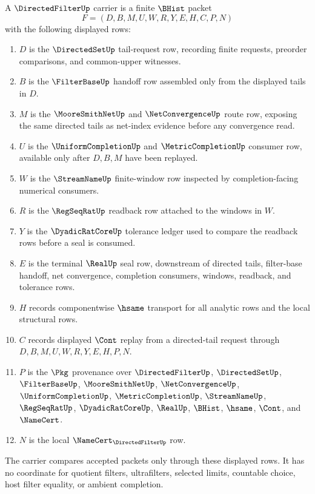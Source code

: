 \begin{definition}\label{def:directed-filter-carrier}
A $\DirectedFilterUp$ carrier is a finite $\BHist$ packet
$$
F=(D,B,M,U,W,R,Y,E,H,C,P,N)
$$
with the following displayed rows:
\begin{enumerate}
\item $D$ is the $\DirectedSetUp$ tail-request row, recording finite requests, preorder comparisons, and common-upper witnesses.
\item $B$ is the $\FilterBaseUp$ handoff row assembled only from the displayed tails in $D$.
\item $M$ is the $\MooreSmithNetUp$ and $\NetConvergenceUp$ route row, exposing the same directed tails as net-index evidence before any convergence read.
\item $U$ is the $\UniformCompletionUp$ and $\MetricCompletionUp$ consumer row, available only after $D,B,M$ have been replayed.
\item $W$ is the $\StreamNameUp$ finite-window row inspected by completion-facing numerical consumers.
\item $R$ is the $\RegSeqRatUp$ readback row attached to the windows in $W$.
\item $Y$ is the $\DyadicRatCoreUp$ tolerance ledger used to compare the readback rows before a seal is consumed.
\item $E$ is the terminal $\RealUp$ seal row, downstream of directed tails, filter-base handoff, net convergence, completion consumers, windows, readback, and tolerance rows.
\item $H$ records componentwise $\hsame$ transport for all analytic rows and the local structural rows.
\item $C$ records displayed $\Cont$ replay from a directed-tail request through $D,B,M,U,W,R,Y,E,H,P,N$.
\item $P$ is the $\Pkg$ provenance over $\DirectedFilterUp$, $\DirectedSetUp$, $\FilterBaseUp$, $\MooreSmithNetUp$, $\NetConvergenceUp$, $\UniformCompletionUp$, $\MetricCompletionUp$, $\StreamNameUp$, $\RegSeqRatUp$, $\DyadicRatCoreUp$, $\RealUp$, $\BHist$, $\hsame$, $\Cont$, and $\NameCert$.
\item $N$ is the local $\NameCert_{\DirectedFilterUp}$ row.
\end{enumerate}
The carrier compares accepted packets only through these displayed rows. It has no coordinate for quotient filters, ultrafilters, selected limits, countable choice, host filter equality, or ambient completion.
\end{definition}

